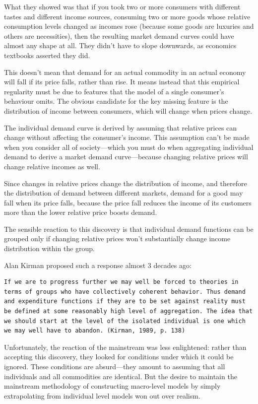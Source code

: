 \documentclass[
]{book}
\begin{document}
What they showed was that if you took two or more consumers with different tastes and different income sources, consuming two or more goods whose relative consumption levels changed as incomes rose (because some goods are luxuries and others are necessities), then the resulting market demand curves could have almost any shape at all. They didn't have to slope downwards, as economics textbooks asserted they did.

This doesn't mean that demand for an actual commodity in an actual economy will fall if its price falls, rather than rise. It means instead that this empirical regularity must be due to features that the model of a single consumer's behaviour omits. The obvious candidate for the key missing feature is the distribution of income between consumers, which will change when prices change.

The individual demand curve is derived by assuming that relative prices can change without affecting the consumer's income. This assumption can't be made when you consider all of society---which you must do when aggregating individual demand to derive a market demand curve---because changing relative prices will change relative incomes as well.

Since changes in relative prices change the distribution of income, and therefore the distribution of demand between different markets, demand for a good may fall when its price falls, because the price fall reduces the income of its customers more than the lower relative price boosts demand.

The sensible reaction to this discovery is that individual demand functions can be grouped only if changing relative prices won't substantially change income distribution within the group.

Alan Kirman proposed such a response almost 3 decades ago:

\begin{verbatim}
If we are to progress further we may well be forced to theories in terms of groups who have collectively coherent behavior. Thus demand and expenditure functions if they are to be set against reality must be defined at some reasonably high level of aggregation. The idea that we should start at the level of the isolated individual is one which we may well have to abandon. (Kirman, 1989, p. 138)
\end{verbatim}

Unfortunately, the reaction of the mainstream was less enlightened: rather than accepting this discovery, they looked for conditions under which it could be ignored. These conditions are absurd---they amount to assuming that all individuals and all commodities are identical. But the desire to maintain the mainstream methodology of constructing macro-level models by simply extrapolating from individual level models won out over realism.
\end{document}
